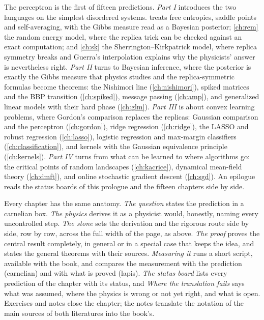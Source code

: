 \begin{refsection}
The perceptron is the first of fifteen predictions. \emph{Part I} introduces the two languages on the simplest disordered systems.  treats free entropies, saddle points and self-averaging, with the Gibbs measure read as a Bayesian posterior; \cref{ch:rem} the random energy model, where the replica trick can be checked against an exact computation; and \cref{ch:sk} the Sherrington--Kirkpatrick model, where replica symmetry breaks and Guerra's interpolation explains why the physicists' answer is nevertheless right. \emph{Part II} turns to Bayesian inference, where the posterior is exactly the Gibbs measure that physics studies and the replica-symmetric formulas become theorems: the Nishimori line (\cref{ch:nishimori}), spiked matrices and the BBP transition (\cref{ch:spiked}), message passing (\cref{ch:amp}), and generalized linear models with their hard phase (\cref{ch:glm}). \emph{Part III} is about convex learning problems, where Gordon's comparison replaces the replicas: Gaussian comparison and the perceptron (\cref{ch:gordon}), ridge regression (\cref{ch:ridge}), the LASSO and robust regression (\cref{ch:lasso}), logistic regression and max-margin classifiers (\cref{ch:classification}), and kernels with the Gaussian equivalence principle (\cref{ch:kernels}). \emph{Part IV} turns from what can be learned to where algorithms go: the critical points of random landscapes (\cref{ch:kacrice}), dynamical mean-field theory (\cref{ch:dmft}), and online stochastic gradient descent (\cref{ch:sgd}). An epilogue reads the status boards of this prologue and the fifteen chapters side by side.

Every chapter has the same anatomy. \emph{The question} states the prediction in a carnelian box. \emph{The physics} derives it as a physicist would, honestly, naming every uncontrolled step. \emph{The stone} sets the derivation and the rigorous route side by side, row by row, across the full width of the page, as above. \emph{The proof} proves the central result completely, in general or in a special case that keeps the idea, and states the general theorems with their sources. \emph{Measuring it} runs a short script, available with the book, and compares the measurement with the prediction (carnelian) and with what is proved (lapis). \emph{The status board} lists every prediction of the chapter with its status, and \emph{Where the translation fails} says what was assumed, where the physics is wrong or not yet right, and what is open. Exercises and notes close the chapter; the notes translate the notation of the main sources of both literatures into the book's.


\end{refsection}
